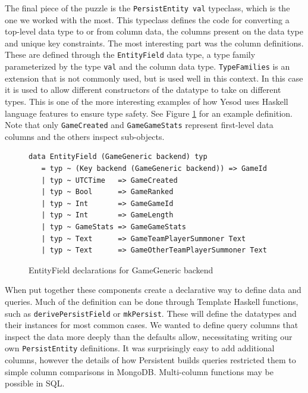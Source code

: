 \documentclass[letterpaper,twocolumn,9pt]{article}
\newcommand{\code}[1]{\texttt{#1}}
\begin{document}
The final piece of the puzzle is the \code{PersistEntity val} typeclass, which is the one we worked with the most.  This typeclass defines the code for converting a top-level data type to or from column data, the columns present on the data type and unique key constraints.  The most interesting part was the column definitions. These are defined through the \code{EntityField} data type, a type family parameterized by the type \code{val} and the column data type.  \code{TypeFamilies} is an extension that is not commonly used, but is used well in this context.  In this case it is used to allow different constructors of the datatype to take on different types.  This is one of the more interesting examples of how Yesod uses Haskell language features to ensure type safety.  See Figure \ref{EntityField} for an example definition. Note that only \code{GameCreated} and \code{GameGameStats} represent first-level data columns and the others inspect sub-objects.

\begin{figure}[]
\scriptsize{
\begin{verbatim}
data EntityField (GameGeneric backend) typ
   = typ ~ (Key backend (GameGeneric backend)) => GameId
   | typ ~ UTCTime   => GameCreated
   | typ ~ Bool      => GameRanked
   | typ ~ Int       => GameGameId
   | typ ~ Int       => GameLength
   | typ ~ GameStats => GameGameStats
   | typ ~ Text      => GameTeamPlayerSummoner Text
   | typ ~ Text      => GameOtherTeamPlayerSummoner Text
\end{verbatim}
}
    \caption{EntityField declarations for GameGeneric backend}
    \label{EntityField}
\end{figure}

When put together these components create a declarative way to define data and queries.  Much of the definition can be done through Template Haskell functions, such as \code{derivePersistField} or \code{mkPersist}.  These will define the datatypes and their instances for most common cases.  We wanted to define query columns that inspect the data more deeply than the defaults allow, necessitating writing our own \code{PersistEntity} definitions.  It was surprisingly easy to add additional columns, however the details of how Persistent builds queries restricted them to simple column comparisons in MongoDB. Multi-column functions may be possible in SQL.
\end{document}
